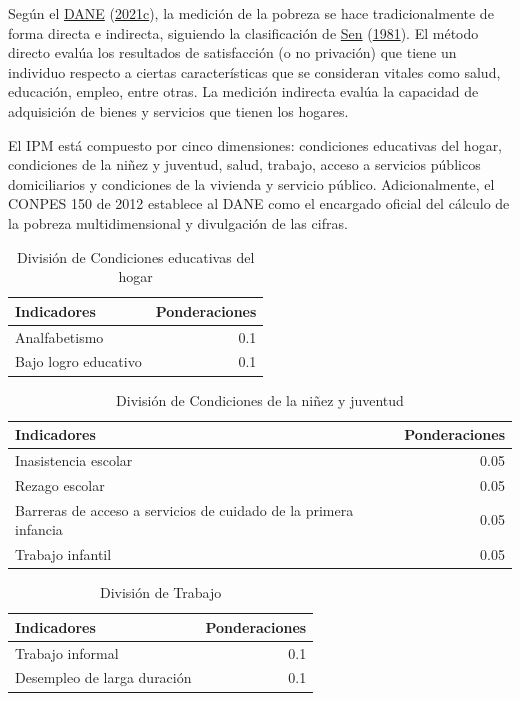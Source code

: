 \documentclass[
  11pt,
]{book}
\begin{document}
Según el \protect\hyperlink{ref-paginadane}{DANE} (\protect\hyperlink{ref-paginadane}{2021c}), la medición de la pobreza se hace tradicionalmente de forma directa e indirecta, siguiendo la clasificación de \protect\hyperlink{ref-sen1981issues}{Sen} (\protect\hyperlink{ref-sen1981issues}{1981}). El método directo evalúa los resultados de satisfacción (o no privación) que tiene un individuo respecto a ciertas características que se consideran vitales como salud, educación, empleo, entre otras. La medición indirecta evalúa la capacidad de adquisición de bienes y servicios que tienen los hogares.

El IPM está compuesto por cinco dimensiones: condiciones educativas del hogar, condiciones de la
niñez y juventud, salud, trabajo, acceso a servicios públicos domiciliarios y condiciones de la
vivienda y servicio público. Adicionalmente, el CONPES 150 de 2012 establece al DANE como el encargado oficial
del cálculo de la pobreza multidimensional y divulgación de las cifras.

\begin{table}

\caption{\label{tab:unnamed-chunk-11}División de Condiciones educativas del hogar }
\centering
\begin{tabular}[t]{l|r}
\hline
Indicadores  & Ponderaciones\\
\hline
Analfabetismo & 0.1\\
\hline
Bajo logro educativo & 0.1\\
\hline
\end{tabular}
\end{table}

\begin{table}

\caption{\label{tab:unnamed-chunk-12}División de Condiciones de la niñez y juventud }
\centering
\begin{tabular}[t]{l|r}
\hline
Indicadores  & Ponderaciones\\
\hline
Inasistencia escolar & 0.05\\
\hline
Rezago escolar & 0.05\\
\hline
Barreras de acceso a servicios de cuidado de la primera infancia & 0.05\\
\hline
Trabajo infantil & 0.05\\
\hline
\end{tabular}
\end{table}

\begin{table}

\caption{\label{tab:unnamed-chunk-13}División de Trabajo }
\centering
\begin{tabular}[t]{l|r}
\hline
Indicadores  & Ponderaciones\\
\hline
Trabajo informal & 0.1\\
\hline
Desempleo de larga duración & 0.1\\
\hline
\end{tabular}
\end{table}
\end{document}
